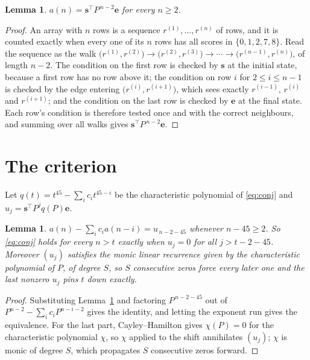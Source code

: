 \documentclass[11pt,a4paper]{article}
\theoremstyle{plain}
\newtheorem{lemma}[theorem]{Lemma}
\theoremstyle{definition}
\begin{document}
\begin{lemma}\label{lem:walk}
$a(n)=\mathbf{s}^{\!\top}P^{\,n-2}\mathbf{e}$ for every $n\ge2$.
\end{lemma}

\begin{proof}
An array with $n$ rows is a sequence $r^{(1)},\dots,r^{(n)}$ of rows, and it is counted
exactly when every one of its $n$ rows has all scores in $\{0,1,2,7,8\}$. Read the sequence as the
walk $\bigl(r^{(1)},r^{(2)}\bigr)\to\bigl(r^{(2)},r^{(3)}\bigr)\to\cdots\to
\bigl(r^{(n-1)},r^{(n)}\bigr)$, of length $n-2$. The condition on the first row is
checked by $\mathbf{s}$ at the initial state, because a first row has no row above it; the
condition on row $i$ for $2\le i\le n-1$ is checked by the edge entering
$\bigl(r^{(i)},r^{(i+1)}\bigr)$, which sees exactly $r^{(i-1)}$, $r^{(i)}$ and
$r^{(i+1)}$; and the condition on the last row is checked by $\mathbf{e}$ at the final
state. Each row's condition is therefore tested once and with the correct neighbours, and
summing over all walks gives $\mathbf{s}^{\!\top}P^{\,n-2}\mathbf{e}$.
\end{proof}

\section{The criterion}

Let $q(t)=t^{45}-\sum_i c_i t^{45-i}$ be the characteristic polynomial of
\eqref{eq:conj} and $u_j=\mathbf{s}^{\!\top}P^{j}q(P)\mathbf{e}$.

\begin{lemma}\label{lem:crit}
$a(n)-\sum_i c_i a(n-i)=u_{\,n-2-45}$ whenever $n-45\ge2$. So \eqref{eq:conj}
holds for every $n>t$ exactly when $u_j=0$ for all $j>t-2-45$. Moreover $(u_j)$
satisfies the monic linear recurrence given by the characteristic polynomial of $P$, of
degree $S$, so $S$ consecutive zeros force every later one and the last nonzero $u_j$ pins
$t$ down exactly.
\end{lemma}

\begin{proof}
Substituting Lemma~\ref{lem:walk} and factoring $P^{\,n-2-45}$ out of
$P^{n-2}-\sum_i c_i P^{n-i-2}$ gives the identity, and letting the exponent run gives the
equivalence. For the last part, Cayley--Hamilton gives $\chi(P)=0$ for the characteristic
polynomial $\chi$, so $\chi$ applied to the shift annihilates $(u_j)$; $\chi$ is monic of
degree $S$, which propagates $S$ consecutive zeros forward.
\end{proof}
\end{document}
